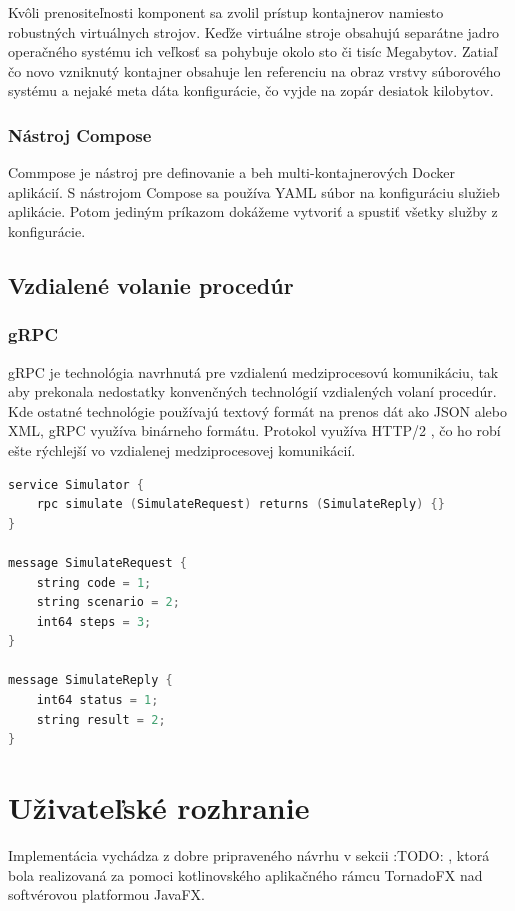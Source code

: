 Kvôli prenositeľnosti komponent sa zvolil prístup kontajnerov namiesto robustných virtuálnych strojov. Keďže virtuálne stroje obsahujú separátne jadro operačného systému ich veľkosť sa pohybuje okolo sto či tisíc Megabytov. Zatiaľ čo novo vzniknutý kontajner obsahuje len referenciu na obraz vrstvy súborového systému a nejaké meta dáta konfigurácie, čo vyjde na zopár desiatok kilobytov. \cite{kane2018docker}

\subsubsection{Nástroj Compose}

Commpose je nástroj pre definovanie a beh multi-kontajnerových Docker aplikácií. S nástrojom Compose sa používa YAML súbor na konfiguráciu služieb aplikácie. Potom jediným príkazom dokážeme vytvoriť a spustiť všetky služby z konfigurácie. \cite{docker_docs}

\subsection{Vzdialené volanie procedúr}

\subsubsection{gRPC}
gRPC je technológia navrhnutá pre vzdialenú medziprocesovú komunikáciu, tak aby prekonala nedostatky konvenčných technológií vzdialených volaní procedúr. Kde ostatné technológie používajú textový formát na prenos dát ako JSON alebo XML, gRPC využíva binárneho formátu. Protokol využíva HTTP/2 \cite{kuruppu2019grpc}, čo ho robí ešte rýchlejší vo vzdialenej medziprocesovej komunikácií.

\begin{lstlisting}[language=C++]
service Simulator {
	rpc simulate (SimulateRequest) returns (SimulateReply) {}
}

message SimulateRequest {
	string code = 1;
	string scenario = 2;
	int64 steps = 3;
}

message SimulateReply {
	int64 status = 1;
	string result = 2;
}
\end{lstlisting}

\section{Uživateľské rozhranie}

Implementácia vychádza z dobre pripraveného návrhu v sekcii :TODO: , ktorá bola realizovaná za pomoci kotlinovského aplikačného rámcu TornadoFX nad softvérovou platformou JavaFX.

